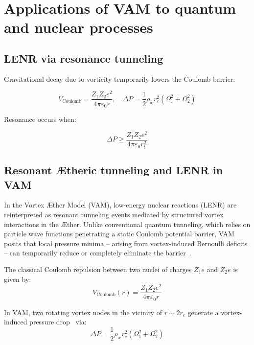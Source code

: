 \section{Applications of VAM to quantum and nuclear processes}
\label{sec:LENR_QED}
\subsection*{LENR via resonance tunneling}

Gravitational decay due to vorticity temporarily lowers the Coulomb barrier:

\begin{equation}
    V_{\text{Coulomb}} = \frac{Z_1 Z_2 e^2}{4\pi \varepsilon_0 r}, \quad \Delta P = \frac{1}{2} \rho_{\text{\ae}} r_c^2 (\Omega_1^2 + \Omega_2^2)
\end{equation}

Resonance occurs when:

\begin{equation}
    \Delta P \geq \frac{Z_1 Z_2 e^2}{4\pi \varepsilon_0 r_t^2}
\end{equation}

\subsection*{Resonant Ætheric tunneling and LENR in VAM}

In the Vortex Æther Model (VAM), low-energy nuclear reactions (LENR) are reinterpreted as resonant tunneling events mediated by structured vortex interactions in the Æther. Unlike conventional quantum tunneling, which relies on particle wave functions penetrating a static Coulomb potential barrier, VAM posits that local pressure minima – arising from vortex-induced Bernoulli deficits – can temporarily reduce or completely eliminate the barrier~\cite{Barcelo2011,Volovik2003}.

The classical Coulomb repulsion between two nuclei of charges \( Z_1 e \) and \( Z_2 e \) is given by:
\begin{equation}
    V_{\text{Coulomb}}(r) = \frac{Z_1 Z_2 e^2}{4\pi \varepsilon_0 r}
\end{equation}

In VAM, two rotating vortex nodes in the vicinity of \( r \sim 2r_c \) generate a vortex-induced pressure drop~\cite{Saffman1992} via:
\begin{equation}
    \Delta P = \frac{1}{2} \rho_{\text{\ae}} r_c^2 (\Omega_1^2 + \Omega_2^2)
\end{equation}

